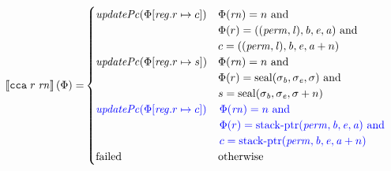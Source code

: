 \documentclass[a4paper]{article}
\begin{document}
\begin{align*}
  \sem{\tcca{r}{\rn}}(\Phi) = & 
                                  \begin{cases}
                                    \updPcAddr{\Phi\updReg{r}{c}} &  
                                    \arraycolsep=0pt
                                    \begin{array}[t]{l}
                                      \Phi(\rn) = n \tand \\
                                      \Phi(r) = ((\perm,\lin),\baddr,\eaddr,\aaddr) \tand \\
                                      c = ((\perm,\lin),\baddr,\eaddr,\aaddr + n)
                                    \end{array}
                                    \\
                                    \updPcAddr{\Phi\updReg{r}{s}} &  
                                    \arraycolsep=0pt
                                    \begin{array}[t]{l}
                                      \Phi(\rn) = n \tand \\
                                      \Phi(r) = \seal{\sigma_\baddr,\sigma_\eaddr,\sigma} \tand \\
                                      s = \seal{\sigma_\baddr,\sigma_\eaddr,\sigma + n}
                                    \end{array}
                                    \\
                                    \src{\updPcAddr{\Phi\updReg{r}{c}}} &  
                                    \sourcecolor\left.
                                    \arraycolsep=0pt
                                    \begin{array}[t]{l}
                                      \Phi(\rn) = n\tand \\
                                      \Phi(r) = \stkptr{\perm,\baddr,\eaddr,\aaddr} \tand \\
                                      c = \stkptr{\perm,\baddr,\eaddr,\aaddr + n}
                                    \end{array}\right.
                                    \\
                                    \failed & \totherwise
                                  \end{cases}
\end{align*}
\end{document}
